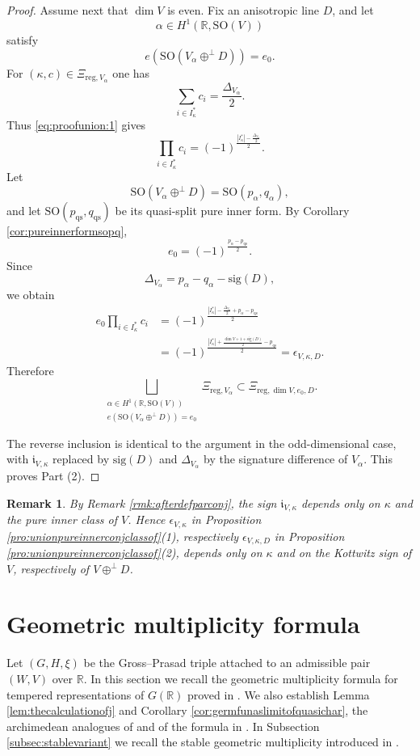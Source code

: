 \documentclass[12pt]{amsart}
\numberwithin{equation}{subsection}
\newcommand{\BR}{{\mathbb {R}}}
\newcommand{\Fi}{{\mathfrak {i}}}
\newcommand{\reg}{{\mathrm{reg}}}
\newcommand{\SO}{{\mathrm{SO}}}
\def\alp{{\alpha}}
\def\Del{{\Delta}}
\def\eps{{\epsilon}}
\def\qs{\mathrm{qs}}
\def\SO{\mathrm{SO}}
\newtheorem{rmk}[thm]{Remark}
\begin{document}
\begin{proof}
Assume next that $\dim V$ is even. Fix an anisotropic line $D$, and let
\[
\alp\in H^1(\BR,\SO(V))
\]
satisfy
\[
e(\SO(V_\alp\oplus^\perp D))=e_0.
\]
For $(\kappa,c)\in \Xi_{\reg,V_\alp}$ one has
\[
\sum_{i\in I^*_\kappa}c_i=\frac{\Del_{V_\alp}}{2}.
\]
Thus \eqref{eq:proofunion:1} gives
\[
\prod_{i\in I^*_\kappa}c_i
=
(-1)^{
\frac{
|I^*_\kappa|-\frac{\Del_{V_\alp}}{2}
}{2}
}.
\]
Let
\[
\SO(V_\alp\oplus^\perp D)=\SO(p_\alp,q_\alp),
\]
and let $\SO(p_\qs,q_\qs)$ be its quasi-split pure inner form. By
Corollary \ref{cor:pureinnerformsopq},
\[
e_0=(-1)^{\frac{p_\alp-p_\qs}{2}}.
\]
Since
\[
\Del_{V_\alp}=p_\alp-q_\alp-\mathrm{sig}(D),
\]
we obtain
\begin{align*}
e_0\prod_{i\in I^*_\kappa}c_i
&=
(-1)^{
\frac{
|I^*_\kappa|
-\frac{\Del_{V_\alp}}{2}
+p_\alp-p_\qs
}{2}
} \\
&=
(-1)^{
\frac{
|I^*_\kappa|
+
\frac{\dim V+1+\mathrm{sig}(D)}{2}
-
p_\qs
}{2}
}
=
\eps_{V,\kappa,D}.
\end{align*}
Therefore
\[
\bigsqcup_{\substack{
\alp\in H^1(\BR,\SO(V))\\
e(\SO(V_\alp\oplus^\perp D))=e_0
}}
\Xi_{\reg,V_\alp}
\subset
\Xi_{\reg,\dim V,e_0,D}.
\]

The reverse inclusion is identical to the argument in the odd-dimensional case,
with $\Fi_{V,\kappa}$ replaced by $\mathrm{sig}(D)$ and
$\Del_{V_\alp}$ by the signature difference of $V_\alp$. This proves Part (2).
\end{proof}

\begin{rmk}\label{rmk:afterpro:unionpureinnerconjclassof}
By Remark \ref{rmk:afterdefparconj}, the sign $\Fi_{V,\kappa}$ depends only on
$\kappa$ and the pure inner class of $V$. Hence $\eps_{V,\kappa}$ in
Proposition \ref{pro:unionpureinnerconjclassof}(1), respectively
$\eps_{V,\kappa,D}$ in Proposition \ref{pro:unionpureinnerconjclassof}(2),
depends only on $\kappa$ and on the Kottwitz sign of $V$, respectively of
$V\oplus^\perp D$.
\end{rmk}










\section{Geometric multiplicity formula}\label{sec:geomultiplicity}

Let $(G,H,\xi)$ be the Gross--Prasad triple attached to an admissible pair
$(W,V)$ over $\BR$. In this section we recall the geometric multiplicity
formula for tempered representations of $G(\BR)$ proved in
\cite{thesis_zhilin}. We also establish Lemma
\ref{lem:thecalculationofj} and Corollary
\ref{cor:germfunaslimitofquasichar}, the archimedean analogues of
\cite[Lem.~13.4~(ii)]{waldspurger10} and of the formula in
\cite[\S 13.6]{waldspurger10}. In Subsection \ref{subsec:stablevariant} we
recall the stable geometric multiplicity introduced in \cite[\S 3.2]{MR3155345}.
\end{document}
